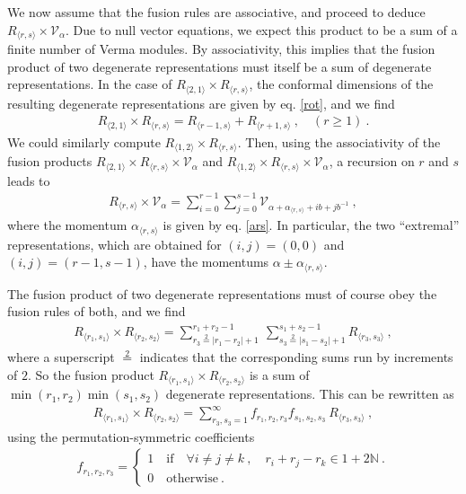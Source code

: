 \documentclass[12pt, a4paper, notitlepage, twoside]{report}
\numberwithin{equation}{section}
\theoremstyle{break}
\begin{document}
We now assume that the fusion rules are associative, and proceed to deduce $R_{\langle r,s \rangle}\times \mathcal{V}_\alpha$.
Due to null vector equations, we expect this product to be a sum of a finite number of Verma modules.
By associativity, this implies that the fusion product of two degenerate representations must itself be a sum of degenerate representations.
In the case of  
$R_{\langle 2,1\rangle}\times R_{\langle r,s\rangle}$, the conformal dimensions of the resulting degenerate representations are given by eq. \eqref{rot}, and we find
\begin{align}
R_{\langle 2,1\rangle}\times R_{\langle r,s\rangle} = R_{\langle r-1,s\rangle} + R_{\langle r+1,s\rangle }\ , \quad (r\geq 1)\ .
\end{align}
We could similarly compute $R_{\langle 1,2\rangle}\times R_{\langle r,s\rangle}$.
Then, using the associativity of the fusion products $R_{\langle 2,1\rangle}\times R_{\langle r,s\rangle}\times \mathcal{V}_\alpha$ and $R_{\langle 1,2\rangle}\times R_{\langle r,s\rangle}\times \mathcal{V}_\alpha$, a recursion on $r$ and $s$ leads to
\begin{align}
 \boxed{R_{\langle r,s \rangle}\times \mathcal{V}_\alpha = \sum_{i=0}^{r-1} \sum_{j=0}^{s-1} \mathcal{V}_{\alpha + \alpha_{\langle r,s \rangle}+ ib+jb^{-1}}}\ ,
\label{rtv}
\end{align}
where the momentum $\alpha_{\langle r,s \rangle}$ is given by eq. \eqref{ars}. 
In particular, the two ``extremal'' representations, which are obtained for $(i,j)=(0,0)$ and $(i,j)=(r-1,s-1)$, have the momentums
$\alpha \pm \alpha_{\langle r,s \rangle} $.

The fusion product of two degenerate representations must of course obey the fusion rules of both, and we find
\begin{align}
 \boxed{R_{\langle r_1,s_1 \rangle} \times R_{\langle r_2,s_2 \rangle} = \sum_{r_3\overset{2}{=}|r_1-r_2|+1}^{r_1+r_2-1}\ \sum_{s_3\overset{2}{=}|s_1-s_2|+1}^{s_1+s_2-1} R_{\langle r_3,s_3 \rangle}}\ ,
\label{rrsr}
\end{align}
where a superscript $\overset{2}{=}$ indicates that the corresponding sums run by increments of $2$.
So the fusion product $R_{\langle r_1,s_1 \rangle} \times R_{\langle r_2,s_2 \rangle}$ is a sum of $\min(r_1,r_2)\min(s_1,s_2)$ degenerate representations.
This can be rewritten as 
\begin{align}
R_{\langle r_1,s_1 \rangle} \times R_{\langle r_2,s_2 \rangle} = \sum_{r_3,s_3=1}^\infty f_{r_1,r_2,r_3} f_{s_1,s_2,s_3}\ R_{\langle r_3,s_3 \rangle}\ ,
 \label{rrrsss}
\end{align}
using the permutation-symmetric coefficients
\begin{align}
f_{r_1,r_2,r_3} = \left\{\begin{array}{l}  1 \quad \text{if} \quad 
 \forall i\neq j\neq k \ , \quad r_i+r_j-r_k \in 1 + 2{\mathbb{N}}\ .
\\ 0 \quad \text{otherwise} \ .\end{array}\right.  
\label{frrr}
\end{align}
\end{document}
